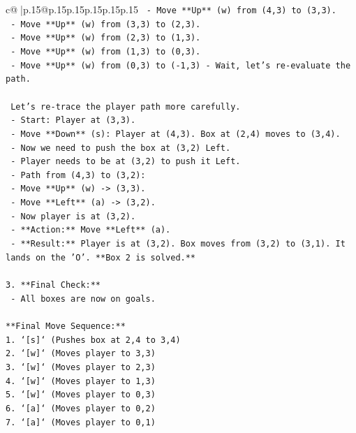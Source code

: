 \documentclass{article}
\begin{document}
{\begin{supertabular}{c@{$\;$}|p{.15\linewidth}@{}p{.15\linewidth}p{.15\linewidth}p{.15\linewidth}p{.15\linewidth}p{.15\linewidth}}
{{{\texttt{    {-} Move **Up** (w) from (4,3) to (3,3).} \\
\texttt{    {-} Move **Up** (w) from (3,3) to (2,3).} \\
\texttt{    {-} Move **Up** (w) from (2,3) to (1,3).} \\
\texttt{    {-} Move **Up** (w) from (1,3) to (0,3).} \\
\texttt{    {-} Move **Up** (w) from (0,3) to ({-}1,3) {-} Wait, let's re{-}evaluate the path.} \\
\\ 
\texttt{    Let's re{-}trace the player path more carefully.} \\
\texttt{    {-} Start: Player at (3,3).} \\
\texttt{    {-} Move **Down** (s): Player at (4,3). Box at (2,4) moves to (3,4).} \\
\texttt{    {-} Now we need to push the box at (3,2) Left.} \\
\texttt{    {-} Player needs to be at (3,2) to push it Left.} \\
\texttt{    {-} Path from (4,3) to (3,2):} \\
\texttt{        {-} Move **Up** (w) {-}> (3,3).} \\
\texttt{        {-} Move **Left** (a) {-}> (3,2).} \\
\texttt{    {-} Now player is at (3,2).} \\
\texttt{    {-} **Action:** Move **Left** (a).} \\
\texttt{    {-} **Result:** Player is at (3,2). Box moves from (3,2) to (3,1). It lands on the 'O'. **Box 2 is solved.**} \\
\\ 
\texttt{3.  **Final Check:**} \\
\texttt{    {-} All boxes are now on goals.} \\
\\ 
\texttt{**Final Move Sequence:**} \\
\texttt{1.  `{[}s{]}` (Pushes box at 2,4 to 3,4)} \\
\texttt{2.  `{[}w{]}` (Moves player to 3,3)} \\
\texttt{3.  `{[}w{]}` (Moves player to 2,3)} \\
\texttt{4.  `{[}w{]}` (Moves player to 1,3)} \\
\texttt{5.  `{[}w{]}` (Moves player to 0,3)} \\
\texttt{6.  `{[}a{]}` (Moves player to 0,2)} \\
\texttt{7.  `{[}a{]}` (Moves player to 0,1)} \\
}}}
\end{supertabular}}
\end{document}
